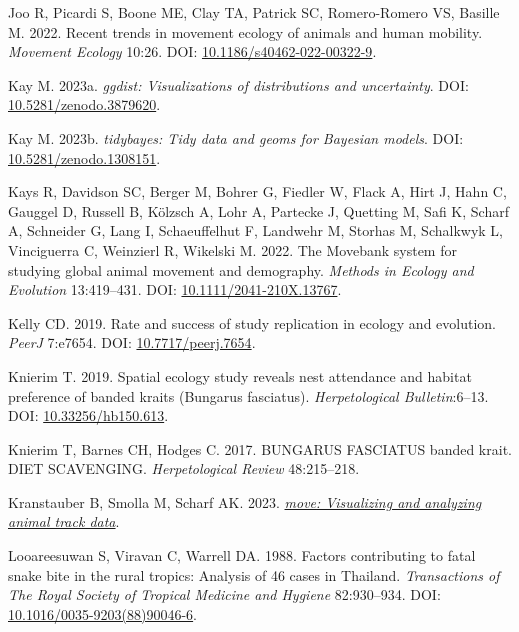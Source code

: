 \documentclass[10pt,a4paper]{article}
\newlength{\cslhangindent}
\newenvironment{CSLReferences}[2] %
 {\begin{list}{}{%
  \setlength{\itemindent}{0pt}
  \setlength{\leftmargin}{0pt}
  \setlength{\parsep}{0pt}
  \ifodd #1
   \setlength{\leftmargin}{\cslhangindent}
   \setlength{\itemindent}{-1\cslhangindent}
  \fi
  \setlength{\itemsep}{#2\baselineskip}}}
 {\end{list}}
\begin{document}
\begin{CSLReferences}{1}{0}
Joo R, Picardi S, Boone ME, Clay TA, Patrick SC, Romero-Romero VS, Basille M. 2022. Recent trends in movement ecology of animals and human mobility. \emph{Movement Ecology} 10:26. DOI: \href{https://doi.org/10.1186/s40462-022-00322-9}{10.1186/s40462-022-00322-9}.

Kay M. 2023a. \emph{{ggdist}: Visualizations of distributions and uncertainty}. DOI: \href{https://doi.org/10.5281/zenodo.3879620}{10.5281/zenodo.3879620}.

Kay M. 2023b. \emph{{tidybayes}: Tidy data and geoms for {Bayesian} models}. DOI: \href{https://doi.org/10.5281/zenodo.1308151}{10.5281/zenodo.1308151}.

Kays R, Davidson SC, Berger M, Bohrer G, Fiedler W, Flack A, Hirt J, Hahn C, Gauggel D, Russell B, Kölzsch A, Lohr A, Partecke J, Quetting M, Safi K, Scharf A, Schneider G, Lang I, Schaeuffelhut F, Landwehr M, Storhas M, Schalkwyk L, Vinciguerra C, Weinzierl R, Wikelski M. 2022. The {Movebank} system for studying global animal movement and demography. \emph{Methods in Ecology and Evolution} 13:419--431. DOI: \href{https://doi.org/10.1111/2041-210X.13767}{10.1111/2041-210X.13767}.

Kelly CD. 2019. Rate and success of study replication in ecology and evolution. \emph{PeerJ} 7:e7654. DOI: \href{https://doi.org/10.7717/peerj.7654}{10.7717/peerj.7654}.

Knierim T. 2019. Spatial ecology study reveals nest attendance and habitat preference of banded kraits ({Bungarus} fasciatus). \emph{Herpetological Bulletin}:6--13. DOI: \href{https://doi.org/10.33256/hb150.613}{10.33256/hb150.613}.

Knierim T, Barnes CH, Hodges C. 2017. BUNGARUS FASCIATUS banded krait. DIET SCAVENGING. \emph{Herpetological Review} 48:215--218.

Kranstauber B, Smolla M, Scharf AK. 2023. \emph{\href{https://CRAN.R-project.org/package=move}{{move}: Visualizing and analyzing animal track data}}.

Looareesuwan S, Viravan C, Warrell DA. 1988. Factors contributing to fatal snake bite in the rural tropics: Analysis of 46 cases in {Thailand}. \emph{Transactions of The Royal Society of Tropical Medicine and Hygiene} 82:930--934. DOI: \href{https://doi.org/10.1016/0035-9203(88)90046-6}{10.1016/0035-9203(88)90046-6}.


\end{CSLReferences}
\end{document}
